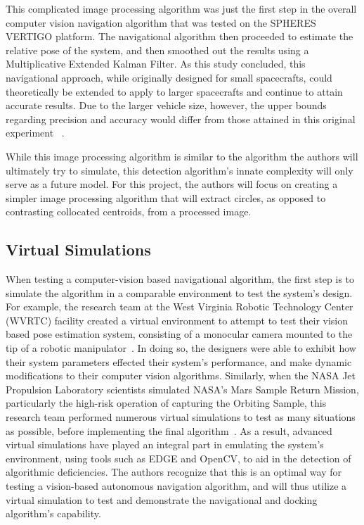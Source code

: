 \documentclass[journal, 10pt]{IEEEtran}
\begin{document}
This complicated image processing algorithm was just the first step in the overall computer vision navigation algorithm that was tested on the SPHERES VERTIGO platform. The navigational algorithm then proceeded to estimate the relative pose of the system, and then smoothed out the results using a Multiplicative Extended Kalman Filter. As this study concluded, this navigational approach, while originally designed for small spacecrafts, could theoretically be extended to apply to larger spacecrafts and continue to attain accurate results. Due to the larger vehicle size, however, the upper bounds regarding precision and accuracy would differ from those attained in this original experiment ~\cite{Vision, Thesis}.

While this image processing algorithm is similar to the algorithm the authors will ultimately try to simulate, this detection algorithm's innate complexity will only serve as a future model. For this project, the authors will focus on creating a simpler image processing algorithm that will extract circles, as opposed to contrasting collocated centroids, from a processed image.

\subsection{Virtual Simulations}

When testing a computer-vision based navigational algorithm, the first step is to simulate the algorithm in a comparable environment to test the system's design. For example, the research team at the West Virginia Robotic Technology Center (WVRTC) facility created a virtual environment to attempt to test their vision based pose estimation system, consisting of a monocular camera mounted to the tip of a robotic manipulator~\cite{virt_sim}. In doing so, the designers were able to exhibit how their system parameters effected their system's performance, and make dynamic modifications to their computer vision algorithms. Similarly, when the NASA Jet Propulsion Laboratory scientists simulated NASA's Mars Sample Return Mission, particularly the high-risk operation of capturing the Orbiting Sample, this research team performed numerous virtual simulations to test as many situations as possible, before implementing the final algorithm~\cite{mars}. As a result, advanced virtual simulations have played an integral part in emulating the system's environment, using tools such as EDGE and OpenCV, to aid in the detection of algorithmic deficiencies. The authors recognize that this is an optimal way for testing a vision-based autonomous navigation algorithm, and will thus utilize a virtual simulation to test and demonstrate the navigational and docking algorithm's capability.
\end{document}
